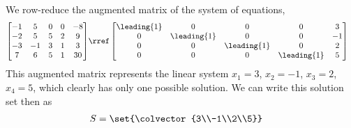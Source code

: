 We row-reduce the augmented matrix of the system of equations,
%
\begin{align*}
\begin{bmatrix}
 -1 & 5 & 0 & 0 & -8 \\
 -2 & 5 & 5 & 2 & 9 \\
 -3 & -1 & 3 & 1 & 3 \\
 7 & 6 & 5 & 1 & 30
\end{bmatrix}
&\rref
\begin{bmatrix}
 \leading{1} & 0 & 0 & 0 & 3 \\
 0 & \leading{1} & 0 & 0 & -1 \\
 0 & 0 & \leading{1} & 0 & 2 \\
 0 & 0 & 0 & \leading{1} & 5
\end{bmatrix}
\end{align*}
%
This augmented matrix represents the linear system $x_1=3$, $x_2=-1$, $x_3=2$, $x_4=5$, which clearly has only one possible solution.  We can write this solution set then as
%
\begin{align*}
S&=\set{\colvector{3\\-1\\2\\5}}
\end{align*}
%
